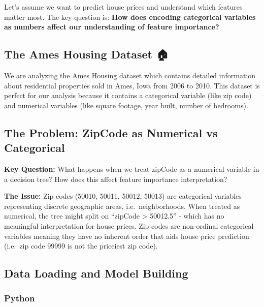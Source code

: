 \documentclass[
  letterpaper,
  DIV=11,
  numbers=noendperiod]{scrartcl}
\begin{document}
Let's assume we want to predict house prices and understand which
features matter most. The key question is: \textbf{How does encoding
categorical variables as numbers affect our understanding of feature
importance?}

\subsection{The Ames Housing Dataset 🏠}\label{the-ames-housing-dataset}

We are analyzing the Ames Housing dataset which contains detailed
information about residential properties sold in Ames, Iowa from 2006 to
2010. This dataset is perfect for our analysis because it contains a
categorical variable (like zip code) and numerical variables (like
square footage, year built, number of bedrooms).

\subsection{The Problem: ZipCode as Numerical vs
Categorical}\label{the-problem-zipcode-as-numerical-vs-categorical}

\textbf{Key Question:} What happens when we treat zipCode as a numerical
variable in a decision tree? How does this affect feature importance
interpretation?

\textbf{The Issue:} Zip codes (50010, 50011, 50012, 50013) are
categorical variables representing discrete geographic areas,
i.e.~neighborhoods. When treated as numerical, the tree might split on
``zipCode \textgreater{} 50012.5'' - which has no meaningful
interpretation for house prices. Zip codes are non-ordinal categorical
variables meaning they have no inherent order that aids house price
prediction (i.e.~zip code 99999 is not the priceiest zip code).

\subsection{Data Loading and Model
Building}\label{data-loading-and-model-building}

\subsubsection{Python}\label{python}
\end{document}
